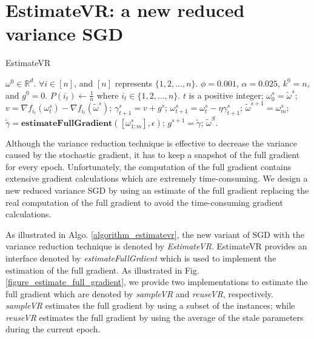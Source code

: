 \documentclass[letterpaper]{article}
\begin{document}
\section{EstimateVR: a new reduced variance SGD}
\label{sect_estimate_vr}

\begin{algorithm}[t]
    \caption{EstimateVR}
    \label{algorithm_estimatevr}
    \begin{algorithmic}[1]
        \Require $\omega^0\in \mathbb{R}^d$. $\forall i\in[n]$, and $[n]$ represents $\{1,2, ..., n\}$. $\phi=0.001$, $\alpha=0.025$, $k^0=n$, and $g^0=0$.
        \State $P(i_t)\leftarrow \frac{1}{n}$ where $i_t \in \{1,2, ..., n\}$. $t$ is a positive integer;
            \State $\omega_0^s=\tilde{\omega}^s$;
                \State  $v=\nabla f_{i_t}(\omega_t^s)-\nabla f_{i_t}(\tilde{\omega}^s)$;
                \State $\gamma_{t+1}^s=v+g^s$;
                \State $\omega_{t+1}^s = \omega_t^s - \eta \gamma_{t+1}^s$;
            \EndFor
            \State $\tilde{\omega}^{s+1} = \omega_m^s$;
            \State $\tilde{\gamma}=\textbf{estimateFullGradient}([\omega_{1:m}^{s}], \epsilon)$;
              \State $g^{s+1} = \tilde{\gamma}$;
          \EndFor
        \Return $\tilde{\omega}^S$.
    \end{algorithmic}
\end{algorithm}

Although  the variance reduction technique is effective to decrease the variance caused by the stochastic gradient, it has to keep a snapshot of the full gradient for every epoch. Unfortunately, the computation of the full gradient contains extensive gradient calculations which  are extremely time-consuming.  We design a new reduced variance SGD by using an estimate of the full gradient replacing the real computation of the full gradient to avoid the time-consuming gradient calculations. 

As illustrated in Algo. \ref{algorithm_estimatevr}, the new variant of SGD with the variance reduction technique is denoted by \emph{EstimateVR}. EstimateVR provides an interface denoted by \emph{estimateFullGrdient} which is used to implement the estimation of the full gradient. As illustrated in Fig. \ref{figure_estimate_full_gradient}, we provide two implementations to estimate the full gradient which are denoted by \emph{sampleVR} and \emph{reuseVR}, respectively. \emph{sampleVR} estimates the full gradient by using a subset of the instances; while \emph{reuseVR} estimates the full gradient by using the average of the stale parameters during the current epoch. 
\end{document}
